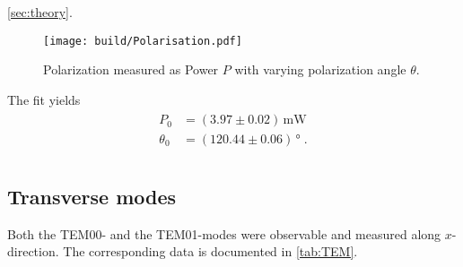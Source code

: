    \autoref{sec:theory}. %
   \begin{figure}
      \centering
      \texttt{[image: build/Polarisation.pdf]}
      \caption{Polarization measured as Power $P$ with varying polarization angle $\theta$.}
      \label{fig:polarization}
   \end{figure}
   The fit yields 
   \begin{align}
      \begin{split}
         P_0&=(3.97\pm0.02)\,\unit{\milli\watt} \\
         \theta_0&=(120.44\pm0.06)\,\unit{\degree}\;. \\
         \label{eq:polarization_fit}
      \end{split}
   \end{align}
   
   \subsection{Transverse modes}
   Both the TEM00- and the TEM01-modes were observable and measured along $x$-direction. 
   The corresponding data is documented in \autoref{tab:TEM}. 
   
